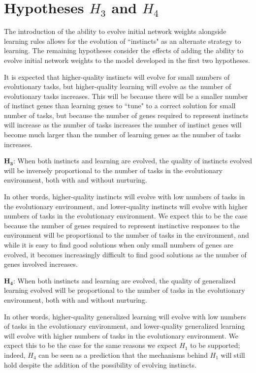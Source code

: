 \documentclass[master]{outhesis}
\begin{document}
\section{Hypotheses $H_3$ and $H_4$}

The introduction of the ability to evolve initial network weights alongside learning rules allows for the evolution of ``instincts" as an alternate strategy to learning. The remaining hypotheses consider the effects of adding the ability to evolve initial network weights to the model developed in the first two hypotheses.

It is expected that higher-quality instincts will evolve for small numbers of evolutionary tasks, but higher-quality learning will evolve as the number of evolutionary tasks increases.
This will be because there will be a smaller number of instinct genes than learning genes to ``tune" to a correct solution for small number of tasks, but because the number of genes required to represent instincts will increase as the number of tasks increases the number of instinct genes will become much larger than the number of learning genes as the number of tasks increases.

$\mathbf{H_3}$: When both instincts and learning are evolved, the quality of instincts evolved will be inversely proportional to the number of tasks in the evolutionary environment, both with and without nurturing.

In other words, higher-quality instincts will evolve with low numbers of tasks in the evolutionary environment,
and lower-quality instincts will evolve with higher numbers of tasks in the evolutionary environment.
We expect this to be the case because the number of genes required to represent instinctive responses to the environment will be proportional to the number of tasks in the environment,
and while it is easy to find good solutions when only small numbers of genes are evolved,
it becomes increasingly difficult to find good solutions as the number of genes involved increases.

$\mathbf{H_4}$: When both instincts and learning are evolved, the quality of generalized learning evolved will be proportional to the number of tasks in the evolutionary environment, both with and without nurturing.

In other words, higher-quality generalized learning will evolve with low numbers of tasks in the evolutionary environment,
and lower-quality generalized learning will evolve with higher numbers of tasks in the evolutionary environment.
We expect this to be the case for the same reasons we expect $H_1$ to be supported;
indeed, $H_4$ can be seen as a prediction that the mechanisms behind $H_1$ will still hold despite the addition of the possibility of evolving instincts.
\end{document}
